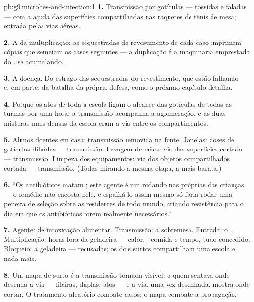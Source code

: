 \begin{solution}{pb:g9:microbes-and-infection:1}
\textbf{1.} Transmissão por gotículas --- tossidas e faladas
--- com a ajuda das superfícies compartilhadas nas raquetes
de tênis de mesa; entrada pelas vias aéreas.

\textbf{2.} A da multiplicação: as  sequestradas do
revestimento de cada caso imprimem cópias que semeiam os
casos seguintes --- a duplicação é a maquinaria emprestada do
, se acumulando.

\textbf{3.} A doença. Do estrago das  sequestradas do
revestimento, que estão falhando --- e, em parte, da batalha
da própria defesa, como o próximo capítulo detalha.

\textbf{4.} Porque os atos de toda a escola ligam o alcance
das gotículas de todas as turmas por uma hora: a transmissão
acompanha a aglomeração, e as duas misturas mais densas da
escola eram a via entre os compartimentos.

\textbf{5.} Alunos doentes em casa: transmissão removida na
fonte. Janelas: doses de gotículas diluídas --- transmissão.
Lavagem de mãos: via das superfícies cortada --- transmissão.
Limpeza dos equipamentos: via dos objetos compartilhados
cortada --- transmissão. (Todas mirando a mesma etapa, a mais
barata.)

\textbf{6.} ``Os antibióticos matam ; este agente é
um  rodando nas próprias  das crianças --- o
remédio não encosta nele, e espalhá-lo assim mesmo só faria
rodar uma peneira de seleção sobre as  residentes de
todo mundo, criando resistência para o dia em que os
antibióticos forem realmente necessários.''

\textbf{7.} Agente:  de intoxicação alimentar.
Transmissão: a sobremesa. Entrada: o .
Multiplicação: horas fora da geladeira --- calor, ,
comida e tempo, tudo concedido. Bloqueio: a geladeira ---
 recusadas; os dois surtos compartilham uma escola e
nada mais.

\textbf{8.} Um mapa de surto é a transmissão tornada visível:
o quem-sentava-onde desenha a via --- fileiras, duplas, atos
--- e a via, uma vez desenhada, mostra onde cortar. O
tratamento aleatório combate casos; o mapa combate a
propagação.


\end{solution}

